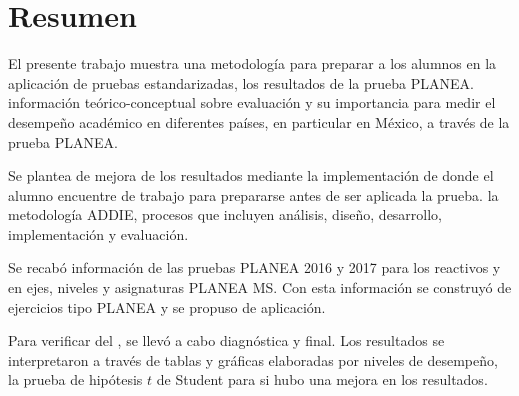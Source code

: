 \chapter*{Resumen}

\setcounter{page}{1}
\noindent El presente trabajo muestra una metodología para preparar a los alumnos en la aplicación de pruebas estandarizadas,  los resultados de la prueba PLANEA.  información teórico-conceptual sobre evaluación y su importancia para medir el desempeño académico  en diferentes países, en particular en México, a través de la prueba PLANEA.

\noindent Se plantea  de mejora de los resultados mediante la implementación de  donde el alumno encuentre  de trabajo para prepararse  antes de ser aplicada la prueba.  la metodología ADDIE,  procesos que incluyen  análisis, diseño, desarrollo, implementación y evaluación.

\noindent Se recabó información de las pruebas PLANEA 2016 y 2017 para  los reactivos y  en ejes, niveles y asignaturas  PLANEA MS. Con esta información se construyó  de ejercicios tipo PLANEA y se propuso  de aplicación.

\noindent Para verificar  del , se llevó a cabo  diagnóstica y final. Los resultados se interpretaron a través de tablas y gráficas elaboradas por niveles de desempeño,  la prueba de hipótesis $t$ de Student para  si hubo una mejora  en los resultados.